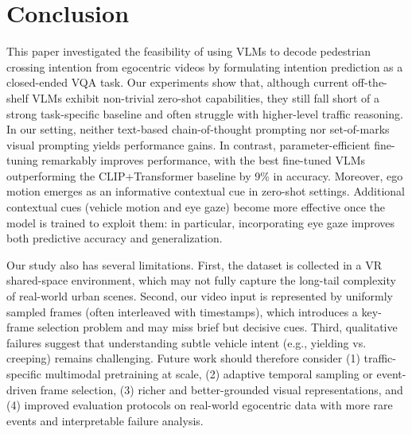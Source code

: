 \documentclass[letterpaper, 10pt, journal]{IEEEtran}  %
\begin{document}







\section{Conclusion}
\label{sec:conclusion}

This paper investigated the feasibility of using VLMs to decode pedestrian crossing intention from egocentric videos by formulating intention prediction as a closed-ended VQA task. Our experiments show that, although current off-the-shelf VLMs exhibit non-trivial zero-shot capabilities, they still fall short of a strong task-specific baseline and often struggle with higher-level traffic reasoning. In our setting, neither text-based chain-of-thought prompting nor set-of-marks visual prompting yields performance gains.
In contrast, parameter-efficient fine-tuning remarkably improves performance, with the best fine-tuned VLMs outperforming the CLIP+Transformer baseline by 9\% in accuracy.
Moreover, ego motion emerges as an informative contextual cue in zero-shot settings.
Additional contextual cues (vehicle motion and eye gaze) become more effective once the model is trained to exploit them: in particular, incorporating eye gaze improves both predictive accuracy and generalization.

Our study also has several limitations. First, the dataset is collected in a VR shared-space environment, which may not fully capture the long-tail complexity of real-world urban scenes. 
Second, our video input is represented by uniformly sampled frames (often interleaved with timestamps), which introduces a key-frame selection problem and may miss brief but decisive cues. Third, qualitative failures suggest that understanding subtle vehicle intent (e.g., yielding vs. creeping) remains challenging.
Future work should therefore consider (1) traffic-specific multimodal pretraining at scale, (2) adaptive temporal sampling or event-driven frame selection, (3) richer and better-grounded visual representations, and (4) improved evaluation protocols on real-world egocentric data with more rare events and interpretable failure analysis.
\end{document}

